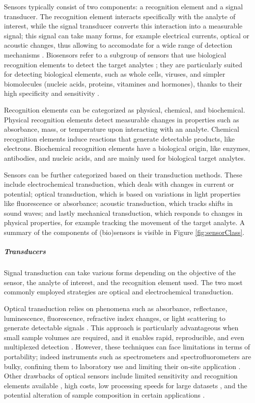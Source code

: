 Sensors typically consist of two components: a recognition element and a signal transducer. The recognition element interacts specifically with the analyte of interest, while the signal transducer converts this interaction into a measurable signal; this signal can take many forms, for example electrical currents, optical or acoustic changes, thus allowing to accomodate for a wide range of detection mechanisms \citep{hulanickiChemical1991,mehrotraBiosensors2016}. Biosensors refer to a subgroup of sensors that use biological recognition elements to detect the target analytes \citep{nagelGlossary1992}; they are particularly suited for detecting biological elements, such as whole cells, viruses, and simpler biomolecules (nucleic acids, proteins, vitamines and hormones), thanks to their high specificity and sensitivity \citep{mehrotraBiosensors2016}.

Recognition elements can be categorized as physical, chemical, and biochemical. Physical recognition elements detect measurable changes in properties such as absorbance, mass, or temperature upon interacting with an analyte. Chemical recognition elements induce reactions that generate detectable products, like electrons. Biochemical recognition elements have a biological origin, like enzymes, antibodies, and nucleic acids, and are mainly used for biological target analytes.

Sensors can be further categorized based on their transduction methods. These include electrochemical transduction, which deals with changes in current or potential; optical transduction, which is based on variations in light properties like fluorescence or absorbance; acoustic transduction, which tracks shifts in sound waves; and lastly mechanical transduction, which responds to changes in physical properties, for example tracking the movement of the target analyte. A summary of the components of (bio)sensors is visible in Figure \ref{fig:sensorClass}.

\subparagraph{Transducers}
Signal transduction can take various forms depending on the objective of the sensor, the analyte of interest, and the recognition element used. The two most commonly employed strategies are optical and electrochemical transduction.

Optical transduction relies on phenomena such as absorbance, reflectance, luminescence, fluorescence, refractive index changes, or light scattering to generate detectable signals \citep{danchukOptical2020}. This approach is particularly advantageous when small sample volumes are required, and it enables rapid, reproducible, and even multiplexed detection \citep{chenOptical2020}. However, these techniques can face limitations in terms of portability; indeed instruments such as spectrometers and spectrofluorometers are bulky, confining them to laboratory use and limiting their on-site application \citep{elsherifOptical2022}. Other drawbacks of optical sensors include limited sensitivity and recognition elements available \citep{yanReview2018}, high costs, low processing speeds for large datasets \citep{al-ashwalDeep2023}, and the potential alteration of sample composition in certain applications \citep{ignestiNew2016}.

